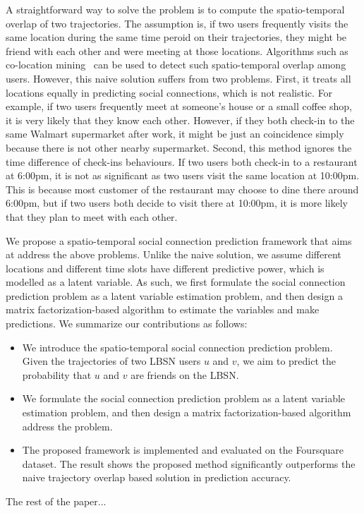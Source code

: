A straightforward way to solve the problem is to compute the spatio-temporal overlap of two trajectories. The assumption is, if two users frequently visits the same location during the same time peroid on their trajectories, they might be friend with each other and were meeting at those locations. Algorithms such as co-location mining~\cite{weiler2015geo} can be used to detect such spatio-temporal overlap among users. However, this naive solution suffers from two problems. First, it treats all locations equally in predicting social connections, which is not realistic. For example, if two users frequently meet at someone's house or a small coffee shop, it is very likely that they know each other. However, if they both check-in to the same Walmart supermarket after work, it might be just an coincidence simply because there is not other nearby supermarket. Second, this method ignores the time difference of check-ins behaviours. If two users both check-in to a restaurant at 6:00pm, it is not as significant as two users visit the same location at 10:00pm. This is because most customer of the restaurant may choose to dine there around 6:00pm, but if two users both decide to visit there at 10:00pm, it is more likely that they plan to meet with each other.

We propose a spatio-temporal social connection prediction framework that aims at address the above problems. Unlike the naive solution, we assume different locations and different time slots have different predictive power, which is modelled as a latent variable. As such, we first formulate the social connection prediction problem as a latent variable estimation problem, and then design a matrix factorization-based algorithm to estimate the variables and make predictions. We summarize our contributions as follows:
\begin{itemize}

\item We introduce the spatio-temporal social connection prediction problem. Given the trajectories of two LBSN users $u$ and $v$, we aim to predict the probability that $u$ and $v$ are friends on the LBSN.

\item We formulate the social connection prediction problem as a latent variable estimation problem, and then design a matrix factorization-based algorithm address the problem.

\item The proposed framework is implemented and evaluated on the Foursquare dataset. The result shows the proposed method significantly outperforms the naive trajectory overlap based solution in prediction accuracy. 

\end{itemize} 

The rest of the paper...

  
